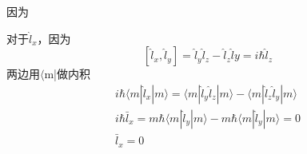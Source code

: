 因为

对于$\hat{l}_x$，因为
$$
\left[ \hat{l}_x,\hat{l}_y \right]=\hat{l}_y\hat{l}_z-\hat{l}_z\hat{l}y =i\hbar \hat{l}_z
$$
两边用$\langle$m|做内积
\begin{align*}
i\hbar \left. \langle m|\hat{l}_x|m \right. \rangle =\langle m|\hat{l}_y\hat{l}_z|m\rangle -\left. \langle m\left| \hat{l}_z\hat{l}_y \right|m \right. \rangle\\
	i\hbar \bar{l}_x=m\hbar \langle m|\hat{l}_y|m\rangle -m\hbar \left. \langle m|\hat{l}_y|m \right. \rangle =0\\
	\bar{l}_x=0
\end{align*}